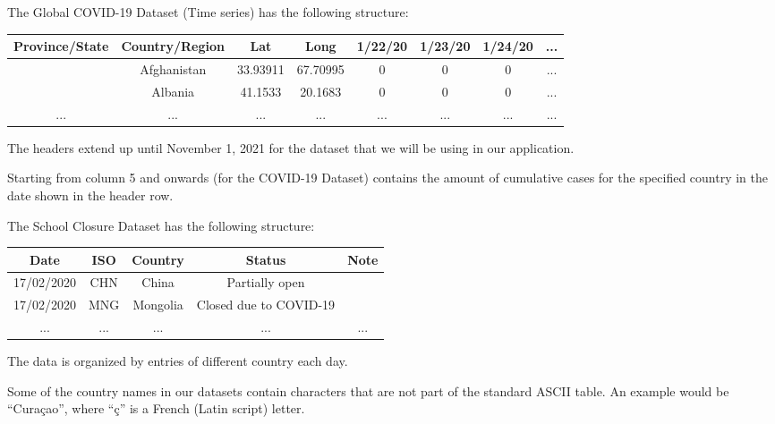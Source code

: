 \documentclass[fontsize=11pt]{article}
\begin{document}
    The Global COVID-19 Dataset (Time series) has the following structure:

    \begin{center}
        \begin{tabular}{ |c|c|c|c|c|c|c|c| }
            \hline
            Province/State & Country/Region & Lat      & Long     & 1/22/20 & 1/23/20 & 1/24/20 & ... \\
            \hline
            & Afghanistan    & 33.93911 & 67.70995 & 0       & 0       & 0       & ... \\
            \hline
            & Albania        & 41.1533  & 20.1683  & 0       & 0       & 0       & ... \\
            \hline
            ...            & ...            & ...      & ...      & ...     & ...     & ...     & ... \\
            \hline
        \end{tabular}
    \end{center}

    The headers extend up until November 1, 2021 for the dataset that we will be using in our application.

    Starting from column 5 and onwards (for the COVID-19 Dataset) contains the amount of cumulative cases for the specified country in the date shown in the header row.

    The School Closure Dataset has the following structure:
    \begin{center}
        \begin{tabular}{ |c|c|c|c|c| }
            \hline
            Date       & ISO & Country  & Status                  & Note\\
            \hline
            17/02/2020 & CHN & China    & Partially open          & \\
            \hline
            17/02/2020 & MNG & Mongolia & Closed due to COVID-19  & \\
            \hline
            ...        & ... & ...      & ...                     & ...\\
            \hline
        \end{tabular}
    \end{center}

    The data is organized by entries of different country each day.

    Some of the country names in our datasets contain characters that are not part of the standard ASCII table. An example would be ``Cura\c{c}ao'', where ``\c{c}'' is a French (Latin script) letter.
\end{document}
